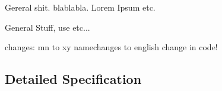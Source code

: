 Gereral shit.
blablabla.
Lorem Ipsum etc.

General Stuff, use etc...

changes:
mn to xy
namechanges to english change in code!

\subsection{Detailed Specification} 